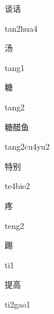 \begin{verbete}{谈话}
\begin{pronuncia}{tan2hua4}
\end{pronuncia}
\end{verbete}

\begin{verbete}[tang1]{汤}
\begin{pronuncia}{tang1}
\end{pronuncia}
\end{verbete}

\begin{verbete}[tang2]{糖}
\begin{pronuncia}{tang2}
\end{pronuncia}
\end{verbete}

\begin{verbete}[tang2cu4yu2]{糖醋鱼}
\begin{pronuncia}{tang2cu4yu2}
\end{pronuncia}
\end{verbete}

\begin{verbete}[te4bie2]{特别}
\begin{pronuncia}{te4bie2}
\end{pronuncia}
\end{verbete}

\begin{verbete}[teng2]{疼}
\begin{pronuncia}{teng2}
\end{pronuncia}
\end{verbete}

\begin{verbete}[ti1]{踢}
\begin{pronuncia}{ti1}
\end{pronuncia}
\end{verbete}

\begin{verbete}[ti2gao1]{提高}
\begin{pronuncia}{ti2gao1}
\end{pronuncia}
\end{verbete}

